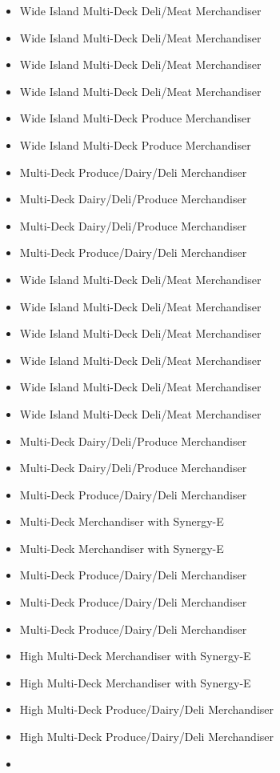 \begin{itemize}
\item
  Wide Island Multi-Deck Deli/Meat Merchandiser
\item
  Wide Island Multi-Deck Deli/Meat Merchandiser
\item
  Wide Island Multi-Deck Deli/Meat Merchandiser
\item
  Wide Island Multi-Deck Deli/Meat Merchandiser
\item
  Wide Island Multi-Deck Produce Merchandiser
\item
  Wide Island Multi-Deck Produce Merchandiser
\item
  Multi-Deck Produce/Dairy/Deli Merchandiser
\item
  Multi-Deck Dairy/Deli/Produce Merchandiser
\item
  Multi-Deck Dairy/Deli/Produce Merchandiser
\item
  Multi-Deck Produce/Dairy/Deli Merchandiser
\item
  Wide Island Multi-Deck Deli/Meat Merchandiser
\item
  Wide Island Multi-Deck Deli/Meat Merchandiser
\item
  Wide Island Multi-Deck Deli/Meat Merchandiser
\item
  Wide Island Multi-Deck Deli/Meat Merchandiser
\item
  Wide Island Multi-Deck Deli/Meat Merchandiser
\item
  Wide Island Multi-Deck Deli/Meat Merchandiser
\item
  Multi-Deck Dairy/Deli/Produce Merchandiser
\item
  Multi-Deck Dairy/Deli/Produce Merchandiser
\item
  Multi-Deck Produce/Dairy/Deli Merchandiser
\item
  Multi-Deck Merchandiser with Synergy-E
\item
  Multi-Deck Merchandiser with Synergy-E
\item
  Multi-Deck Produce/Dairy/Deli Merchandiser
\item
  Multi-Deck Produce/Dairy/Deli Merchandiser
\item
  Multi-Deck Produce/Dairy/Deli Merchandiser
\item
  High Multi-Deck Merchandiser with Synergy-E
\item
  High Multi-Deck Merchandiser with Synergy-E
\item
  High Multi-Deck Produce/Dairy/Deli Merchandiser
\item
  High Multi-Deck Produce/Dairy/Deli Merchandiser
\item

\end{itemize}
